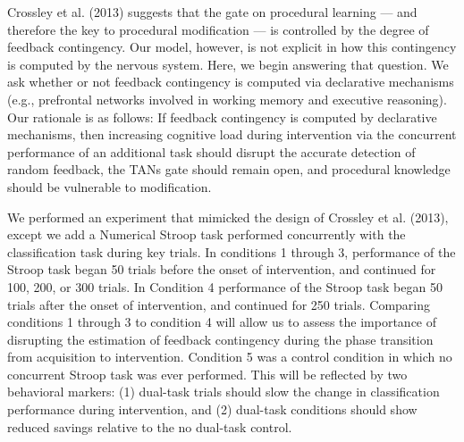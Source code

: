 Crossley et al. (2013) suggests that the gate on procedural learning --- and
therefore the key to procedural modification --- is controlled by the degree of
feedback contingency. Our model, however, is not explicit in how this
contingency is computed by the nervous system. Here, we begin answering
that question. We ask whether or not feedback contingency is computed via
declarative mechanisms (e.g., prefrontal networks involved in working memory and
executive reasoning). Our rationale is as follows: If feedback contingency is
computed by declarative mechanisms, then increasing cognitive load during
intervention via the concurrent performance of an additional task should disrupt
the accurate detection of random feedback, the TANs gate should remain open, and
procedural knowledge should be vulnerable to modification. 

We performed an experiment that mimicked the design of Crossley et al. (2013),
except we add a Numerical Stroop task performed concurrently with the
classification task during key trials. In conditions 1 through 3, performance of
the Stroop task began 50 trials before the onset of intervention, and continued
for 100, 200, or 300 trials. In Condition 4 performance of the Stroop task began
50 trials after the onset of intervention, and continued for 250 trials.
Comparing conditions 1 through 3 to condition 4 will allow us to assess the
importance of disrupting the estimation of feedback contingency during the phase
transition from acquisition to intervention. Condition 5 was a control condition
in which no concurrent Stroop task was ever performed. This will be reflected by
two behavioral markers: (1) dual-task trials should slow the change in
classification performance during intervention, and (2) dual-task conditions
should show reduced savings relative to the no dual-task control.